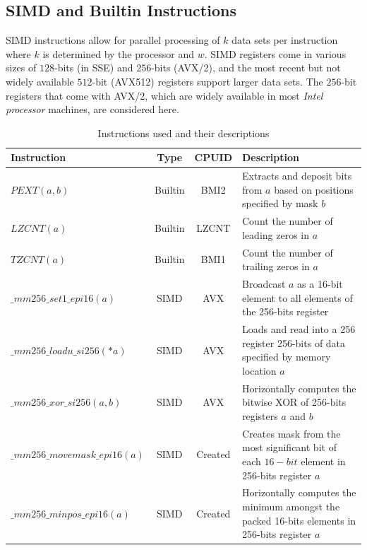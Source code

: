 \subsection{SIMD and Builtin Instructions} SIMD instructions allow for parallel processing of $k$ data sets per instruction where $k$ is determined by the processor and $w$. SIMD registers come in various sizes of $128$-bits (in SSE) and $256$-bits (AVX/2), and the most recent but not widely available $512$-bit (AVX512) registers support larger data sets. The $256$-bit registers that come with AVX/2, which are widely available in most \textit{Intel processor} machines, are considered here.\par
\begin{table}[h]
    \centering
    \begin{tabularx}{\textwidth}{|l|c|c|X|}
    \hline
         \textbf{Instruction} & \textbf{Type} & \textbf{CPUID} & \textbf{Description} \\\hline
         $PEXT(a, b)$ & Builtin & BMI2 & Extracts and deposit bits from $a$ based on positions specified by mask $b$\\\hline
         $LZCNT(a)$ & Builtin & LZCNT & Count the number of leading zeros in $a$\\\hline
         $TZCNT(a)$ & Builtin & BMI1 & Count the number of trailing zeros in $a$\\\hline
         $\_mm256\_set1\_epi16(a)$ & SIMD & AVX & Broadcast $a$ as a 16-bit element to all elements of the 256-bits register\\\hline
         $\_mm256\_loadu\_si256(*a)$ & SIMD & AVX & Loads and read into a 256 register 256-bits of data specified by memory location $a$ \\\hline
         $\_mm256\_xor\_si256(a, b)$ & SIMD & AVX & Horizontally computes the bitwise XOR of 256-bits registers $a$ and $b$ \\\hline
         $\_mm256\_movemask\_epi16(a)$ & SIMD & Created & Creates mask from the most significant bit of each $16-bit$ element in 256-bits register $a$ \\\hline
         $\_mm256\_minpos\_epi16(a)$ & SIMD & Created & Horizontally computes the minimum amongst the packed 16-bits elements in 256-bits register $a$ \\\hline
    \end{tabularx}
    \caption{Instructions used and their descriptions}
    \label{tab:simd-instructions}
\end{table}
\par
